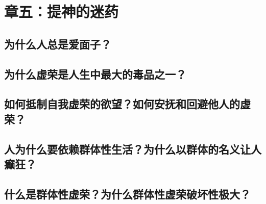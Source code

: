 \chapter{章五：提神的迷药}

\section{为什么人总是爱面子？}
\section{为什么虚荣是人生中最大的毒品之一？}
\section{如何抵制自我虚荣的欲望？如何安抚和回避他人的虚荣？}
\section{人为什么要依赖群体性生活？为什么以群体的名义让人癫狂？}
\section{什么是群体性虚荣？为什么群体性虚荣破坏性极大？}
